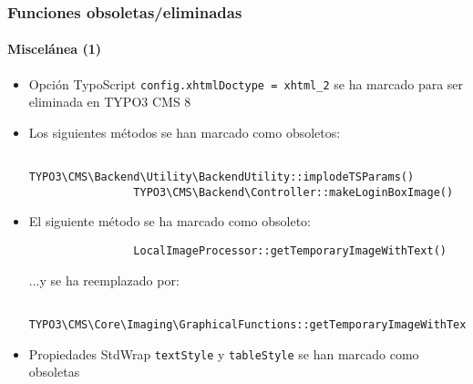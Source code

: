 \begin{frame}[fragile]
	\frametitle{Funciones obsoletas/eliminadas}
	\framesubtitle{Miscelánea (1)}

	\begin{itemize}
		\item Opción TypoScript \texttt{config.xhtmlDoctype = xhtml\_2} se ha marcado para ser eliminada en TYPO3 CMS 8

		\item Los siguientes métodos se han marcado como obsoletos:
			\begin{lstlisting}
				TYPO3\CMS\Backend\Utility\BackendUtility::implodeTSParams()
				TYPO3\CMS\Backend\Controller::makeLoginBoxImage()
			\end{lstlisting}

		\item El siguiente método se ha marcado como obsoleto:
			\begin{lstlisting}
				LocalImageProcessor::getTemporaryImageWithText()
			\end{lstlisting}

			...y se ha reemplazado por:

			\begin{lstlisting}
				TYPO3\CMS\Core\Imaging\GraphicalFunctions::getTemporaryImageWithText()
			\end{lstlisting}

		\item Propiedades StdWrap \texttt{textStyle} y \texttt{tableStyle} se han marcado como obsoletas

	\end{itemize}

\end{frame}


